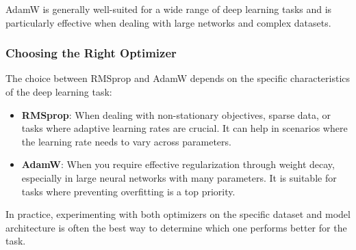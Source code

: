 AdamW is generally well-suited for a wide range of deep learning tasks and is particularly effective when dealing with large networks and complex datasets.

\subsubsection{Choosing the Right Optimizer}

The choice between RMSprop and AdamW depends on the specific characteristics of the deep learning task:

\begin{itemize}
	\item \textbf{RMSprop}: When dealing with non-stationary objectives, sparse data, or tasks where adaptive learning rates are crucial. It can help in scenarios where the learning rate needs to vary across parameters.
	
	\item \textbf{AdamW}: When you require effective regularization through weight decay, especially in large neural networks with many parameters. It is suitable for tasks where preventing overfitting is a top priority.
\end{itemize}

In practice, experimenting with both optimizers on the specific dataset and model architecture is often the best way to determine which one performs better for the task.



